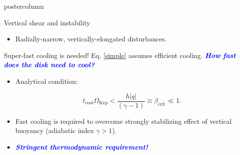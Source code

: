 \documentclass[final,hyperref={pdfpagelabels=false}]{beamer}
\begin{document}
\begin{frame}
\begin{columns}
\begin{column}{.49\textwidth}
\begin{beamercolorbox}[center,wd=\textwidth]{postercolumn}
\begin{minipage}[T]{.95\textwidth}
{\begin{block}{{\Large Vertical shear and instability}}
\begin{itemize}
\begin{displaybox}{22cm}
\begin{align*}
                  &\Rightarrow \quad \text{\textcolor{blue}{\bf
                      INSTABILITY!}}
                  \end{align*}
                \end{displaybox}
                \item Radially-narrow,
                     vertically-elongated disturbances. 
              \end{itemize}
            \end{block}
            

            \begin{block}{{\Large Super-fast cooling is needed!}}
              \justifying
              Eq. \ref{simple} assumes efficient cooling. 
              \textcolor{blue}{\emph{\bf{How fast does the disk need to
                  cool?}}}
            \vspace{-1cm}
            \begin{itemize}
            \item Analytical condition:
              \begin{displaybox}{21cm}
                \[
                t_\mathrm{cool}\Omega_\mathrm{Kep} < \frac{h |q|}{(\gamma -
                  1)} \equiv \beta_\mathrm{crit}\ll 1.   
                \]
              \end{displaybox}
            \item Fast cooling is required to overcome strongly
              stabilizing effect of vertical buoyancy (adiabatic index
              $\gamma>1$).
            \item \textcolor{blue}{\emph{\bf{Stringent thermodynamic
                    requirement!}}}            \end{itemize} 
            \end{block}
            
}
\end{minipage}
\end{beamercolorbox}
\end{column}
\end{columns}
\end{frame}
\end{document}

